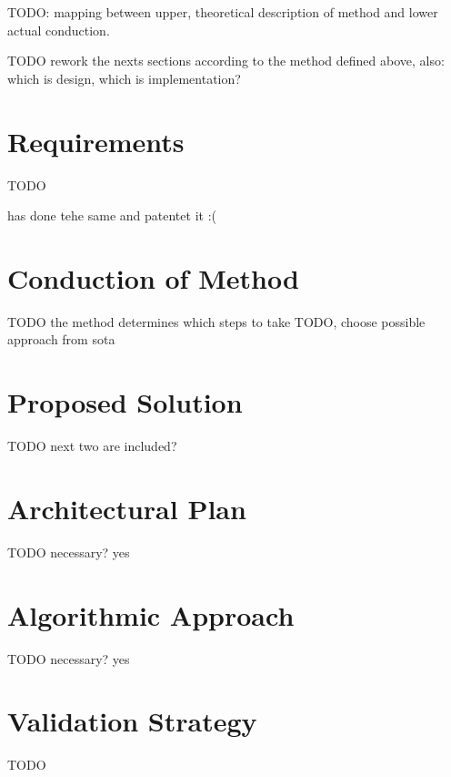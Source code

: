  TODO: mapping between upper, theoretical description of method and  lower actual conduction.
 
 
 TODO rework the nexts sections according to the method defined above, also: which is design, which is implementation?

\section{Requirements}
TODO

\autocite[][]{xang2016trafficlist} has done tehe same and patentet it :(

\section{Conduction of Method}
TODO the method determines which steps to take
TODO, choose possible approach from sota

\section{Proposed Solution}
TODO next two are included?

\section{Architectural Plan}
TODO necessary? yes

\section{Algorithmic Approach}
TODO necessary? yes

\section{Validation Strategy}

TODO